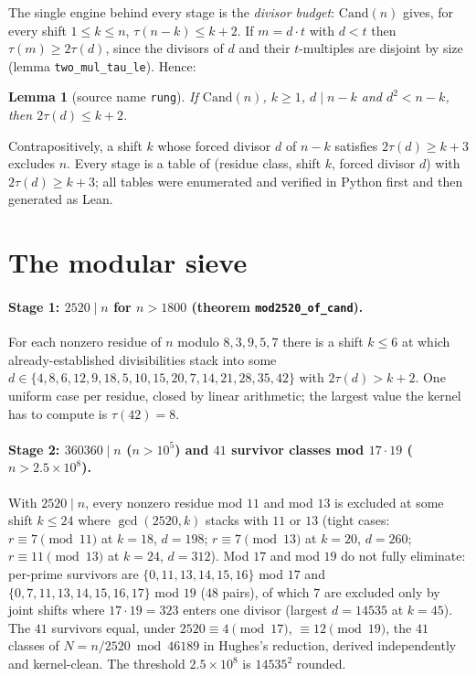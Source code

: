 \documentclass[11pt]{article}
\newcommand{\Cand}{\mathrm{Cand}}
\newtheorem{lemma}[theorem]{Lemma}
\begin{document}
The single engine behind every stage is the \emph{divisor budget}: $\Cand(n)$ gives, for every shift $1\le k\le n$, $\tau(n-k)\le k+2$. If $m=d\cdot t$ with $d<t$ then $\tau(m)\ge2\tau(d)$, since the divisors of $d$ and their $t$-multiples are disjoint by size (lemma \texttt{two\_mul\_tau\_le}). Hence:

\begin{lemma}[source name \texttt{rung}]\label{lem:rung}
If $\Cand(n)$, $k\ge1$, $d\mid n-k$ and $d^{2}<n-k$, then $2\tau(d)\le k+2$.
\end{lemma}

Contrapositively, a shift $k$ whose forced divisor $d$ of $n-k$ satisfies $2\tau(d)\ge k+3$ excludes $n$. Every stage is a table of (residue class, shift $k$, forced divisor $d$) with $2\tau(d)\ge k+3$; all tables were enumerated and verified in Python first and then generated as Lean.

\section{The modular sieve}\label{sec:rungs}

\paragraph{Stage 1: $2520\mid n$ for $n>1800$ (theorem \texttt{mod2520\_of\_cand}).}
For each nonzero residue of $n$ modulo $8,3,9,5,7$ there is a shift $k\le6$ at which already-established divisibilities stack into some $d\in\{4,8,6,12,9,18,5,10,15,20,7,14,21,28,35,42\}$ with $2\tau(d)>k+2$. One uniform case per residue, closed by linear arithmetic; the largest value the kernel has to compute is $\tau(42)=8$.

\paragraph{Stage 2: $360360\mid n$ ($n>10^{5}$) and $41$ survivor classes mod $17\cdot19$ ($n>2.5\times10^{8}$).}
With $2520\mid n$, every nonzero residue mod $11$ and mod $13$ is excluded at some shift $k\le24$ where $\gcd(2520,k)$ stacks with $11$ or $13$ (tight cases: $r\equiv7\pmod{11}$ at $k=18$, $d=198$; $r\equiv7\pmod{13}$ at $k=20$, $d=260$; $r\equiv11\pmod{13}$ at $k=24$, $d=312$). Mod $17$ and mod $19$ do not fully eliminate: per-prime survivors are $\{0,11,13,14,15,16\}$ mod $17$ and $\{0,7,11,13,14,15,16,17\}$ mod $19$ ($48$ pairs), of which $7$ are excluded only by joint shifts where $17\cdot19=323$ enters one divisor (largest $d=14535$ at $k=45$). The $41$ survivors equal, under $2520\equiv4\pmod{17}$, $\equiv12\pmod{19}$, the $41$ classes of $N=n/2520 \bmod 46189$ in Hughes's reduction, derived independently and kernel-clean. The threshold $2.5\times10^{8}$ is $14535^{2}$ rounded.
\end{document}
